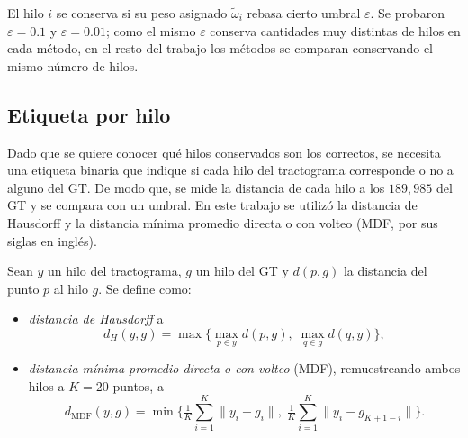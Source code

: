 \documentclass[11pt,a4paper]{article}
\newcommand{\eps}{\varepsilon}
\begin{document}

El hilo $i$ se conserva si su peso asignado $\tilde{\omega}_i$ rebasa cierto umbral $\eps$. Se probaron $\eps=0.1$ y $\eps=0.01$; como el mismo $\eps$ conserva cantidades muy distintas de hilos en cada método, en el resto del trabajo los métodos se comparan conservando el mismo número de hilos.


\subsection{Etiqueta por hilo}

Dado que se quiere conocer qué hilos conservados son los correctos, se necesita una etiqueta binaria que indique si cada hilo del tractograma corresponde o no a alguno del GT. De modo que, se mide la distancia de cada hilo a los $189,985$ del GT y se compara con un umbral. En este trabajo se utilizó la distancia de Hausdorff y la distancia mínima promedio directa o con volteo (MDF, por sus siglas en inglés).

\begin{tcolorbox}[colback=blue!5!white, colframe=blue!75!black,
title=Distancia de Hausdorff y MDF]
Sean $y$ un hilo del tractograma, $g$ un hilo del GT y $d(p,g)$ la distancia del punto $p$
al hilo $g$. Se define como:
\begin{itemize}
    \item \textit{distancia de Hausdorff} a
\[
    d_H(y,g)=\max\Big\{\max_{p\in y} d(p,g),\; \max_{q\in g} d(q,y)\Big\},
\]
    \item \textit{distancia m\'inima promedio directa o con volteo} (MDF), remuestreando
          ambos hilos a $K=20$ puntos, a
\[
    d_{\mathrm{MDF}}(y,g)=\min\Big\{\tfrac1K\sum_{i=1}^{K}\lVert y_i-g_i\rVert,\;
                       \tfrac1K\sum_{i=1}^{K}\lVert y_i-g_{K+1-i}\rVert\Big\} .
\]
\end{itemize}
\end{tcolorbox}
\end{document}
